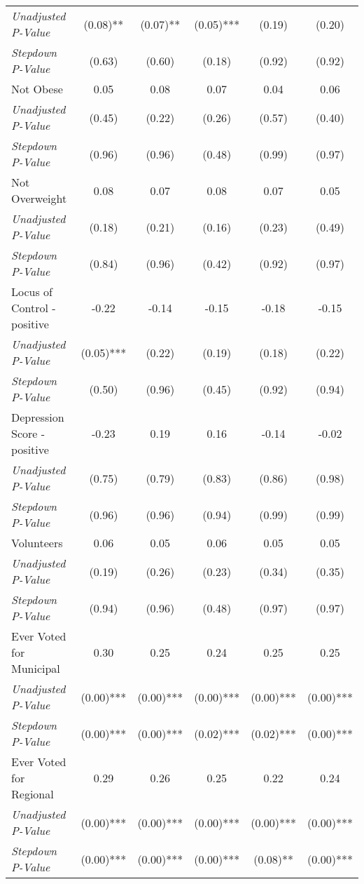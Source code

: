 \begin{tabular}{l c c c c c}
\quad \textit{Unadjusted P-Value} & (0.08)** & (0.07)** & (0.05)*** & (0.19) & (0.20) \\
\quad \textit{Stepdown P-Value} & (0.63) & (0.60) & (0.18) & (0.92) & (0.92) \\
Not Obese & 0.05 & 0.08 & 0.07 & 0.04 & 0.06 \\
\quad \textit{Unadjusted P-Value} & (0.45) & (0.22) & (0.26) & (0.57) & (0.40) \\
\quad \textit{Stepdown P-Value} & (0.96) & (0.96) & (0.48) & (0.99) & (0.97) \\
Not Overweight & 0.08 & 0.07 & 0.08 & 0.07 & 0.05 \\
\quad \textit{Unadjusted P-Value} & (0.18) & (0.21) & (0.16) & (0.23) & (0.49) \\
\quad \textit{Stepdown P-Value} & (0.84) & (0.96) & (0.42) & (0.92) & (0.97) \\
Locus of Control - positive & -0.22 & -0.14 & -0.15 & -0.18 & -0.15 \\
\quad \textit{Unadjusted P-Value} & (0.05)*** & (0.22) & (0.19) & (0.18) & (0.22) \\
\quad \textit{Stepdown P-Value} & (0.50) & (0.96) & (0.45) & (0.92) & (0.94) \\
Depression Score - positive & -0.23 & 0.19 & 0.16 & -0.14 & -0.02 \\
\quad \textit{Unadjusted P-Value} & (0.75) & (0.79) & (0.83) & (0.86) & (0.98) \\
\quad \textit{Stepdown P-Value} & (0.96) & (0.96) & (0.94) & (0.99) & (0.99) \\
Volunteers & 0.06 & 0.05 & 0.06 & 0.05 & 0.05 \\
\quad \textit{Unadjusted P-Value} & (0.19) & (0.26) & (0.23) & (0.34) & (0.35) \\
\quad \textit{Stepdown P-Value} & (0.94) & (0.96) & (0.48) & (0.97) & (0.97) \\
Ever Voted for Municipal & 0.30 & 0.25 & 0.24 & 0.25 & 0.25 \\
\quad \textit{Unadjusted P-Value} & (0.00)*** & (0.00)*** & (0.00)*** & (0.00)*** & (0.00)*** \\
\quad \textit{Stepdown P-Value} & (0.00)*** & (0.00)*** & (0.02)*** & (0.02)*** & (0.00)*** \\
Ever Voted for Regional & 0.29 & 0.26 & 0.25 & 0.22 & 0.24 \\
\quad \textit{Unadjusted P-Value} & (0.00)*** & (0.00)*** & (0.00)*** & (0.00)*** & (0.00)*** \\
\quad \textit{Stepdown P-Value} & (0.00)*** & (0.00)*** & (0.00)*** & (0.08)** & (0.00)*** \\

\end{tabular}
